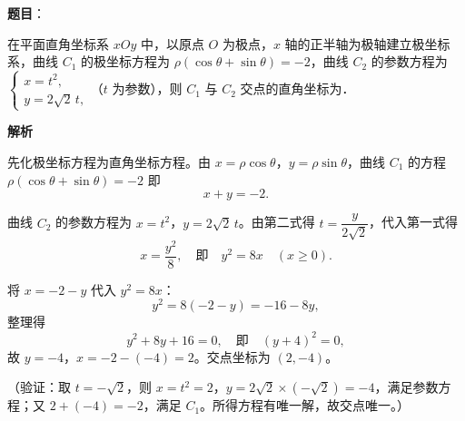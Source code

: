 \begin{answer}

\textbf{题目}：

在平面直角坐标系 \(xOy\) 中，以原点 \(O\) 为极点，\(x\) 轴的正半轴为极轴建立极坐标系，曲线 \(C_1\) 的极坐标方程为 \(\rho(\cos\theta+\sin\theta)=-2\)，曲线 \(C_2\) 的参数方程为 \(\begin{cases}x=t^2,\\ y=2\sqrt{2}\,t,\end{cases}\)（\(t\) 为参数），则 \(C_1\) 与 \(C_2\) 交点的直角坐标为\gkblank{}．

\textbf{解析}

先化极坐标方程为直角坐标方程。由 \(x=\rho\cos\theta\)，\(y=\rho\sin\theta\)，曲线 \(C_1\) 的方程 \(\rho(\cos\theta+\sin\theta)=-2\) 即
\nopagebreak[4]
\[
x+y=-2.
\]

曲线 \(C_2\) 的参数方程为 \(x=t^2\)，\(y=2\sqrt2\,t\)。由第二式得 \(t=\dfrac{y}{2\sqrt2}\)，代入第一式得
\nopagebreak[4]
\[
x=\dfrac{y^2}{8},\quad\text{即}\quad y^2=8x\quad(x\geqslant0).
\]

将 \(x=-2-y\) 代入 \(y^2=8x\)：
\nopagebreak[4]
\[
y^2=8(-2-y)=-16-8y,
\]
整理得
\nopagebreak[4]
\[
y^2+8y+16=0,\quad\text{即}\quad(y+4)^2=0,
\]
故 \(y=-4\)，\(x=-2-(-4)=2\)。交点坐标为 \((2,-4)\)。

（验证：取 \(t=-\sqrt2\)，则 \(x=t^2=2\)，\(y=2\sqrt2\times(-\sqrt2)=-4\)，满足参数方程；又 \(2+(-4)=-2\)，满足 \(C_1\)。所得方程有唯一解，故交点唯一。）


\end{answer}

